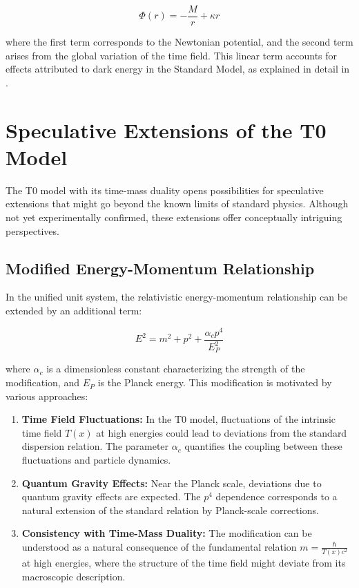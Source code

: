 \documentclass[12pt,a4paper]{article}
\newcommand{\Tfield}{T(x)}
\begin{document}
	\begin{equation}
		\label{eq:grav_potential}
		\Phi(r) = -\frac{M}{r} + \kappa r
	\end{equation}
	
	where the first term corresponds to the Newtonian potential, and the second term arises from the global variation of the time field. This linear term accounts for effects attributed to dark energy in the Standard Model, as explained in detail in \cite{pascher_galaxies_2025}.
	
	\section{Speculative Extensions of the T0 Model}
	\label{sec:speculative}
	
	The T0 model with its time-mass duality opens possibilities for speculative extensions that might go beyond the known limits of standard physics. Although not yet experimentally confirmed, these extensions offer conceptually intriguing perspectives.
	
	\subsection{Modified Energy-Momentum Relationship}
	\label{subsec:modified_energy_momentum}
	
	In the unified unit system, the relativistic energy-momentum relationship can be extended by an additional term:
	
	\begin{equation}
		\label{eq:modified_energy_momentum}
		E^2 = m^2 + p^2 + \frac{\alpha_c p^4}{E_P^2}
	\end{equation}
	
	where \(\alpha_c\) is a dimensionless constant characterizing the strength of the modification, and \(E_P\) is the Planck energy. This modification is motivated by various approaches:
	
	\begin{enumerate}
		\item \textbf{Time Field Fluctuations:} In the T0 model, fluctuations of the intrinsic time field \(\Tfield\) at high energies could lead to deviations from the standard dispersion relation. The parameter \(\alpha_c\) quantifies the coupling between these fluctuations and particle dynamics.
		\item \textbf{Quantum Gravity Effects:} Near the Planck scale, deviations due to quantum gravity effects are expected. The \(p^4\) dependence corresponds to a natural extension of the standard relation by Planck-scale corrections.
		\item \textbf{Consistency with Time-Mass Duality:} The modification can be understood as a natural consequence of the fundamental relation \(m = \frac{\hbar}{\Tfield c^2}\) at high energies, where the structure of the time field might deviate from its macroscopic description.
	\end{enumerate}
	
\end{document}
